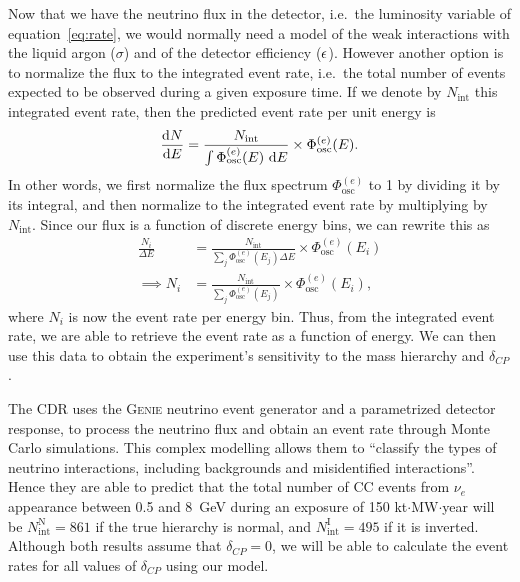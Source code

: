 Now that we have the neutrino flux in the detector, i.e.~the luminosity
variable of equation~\ref{eq:rate}, we would normally need a model of the weak
interactions with the liquid argon ($\sigma$) and of the detector efficiency
($\epsilon$).
However another option is to normalize the flux to the integrated event rate,
i.e.~the total number of events expected to be observed during a given exposure
time. If we denote by $N_\text{int}$ this integrated event rate, then the
predicted event rate per unit energy is
\begin{equation}
	\frac{\mathrm{d} N}{\mathrm{d} E} = \frac{N_\text{int}}{\int \Phi^{(e)}_\text{osc} (E)~\mathrm{d} E}
	\times \Phi^{(e)}_\text{osc} (E).
\end{equation}
In other words, we first normalize the flux spectrum $\Phi^{(e)}_\text{osc}$ to
1 by dividing it by its integral, and then normalize to the integrated event
rate by multiplying by $N_\text{int}$.
Since our flux is a function of discrete energy bins, we can rewrite this as
\begin{align}
	\frac{N_i}{\Delta E} &= \frac{N_\text{int}}{\sum\limits_j \Phi^{(e)}_\text{osc} (E_j)
	\Delta E} \times \Phi^{(e)}_\text{osc} (E_i)\nonumber\\\implies
	N_i &= \frac{N_\text{int}}{\sum\limits_j \Phi^{(e)}_\text{osc} (E_j)} \times
	\Phi^{(e)}_\text{osc} (E_i),\label{eq:event_rate_0}
\end{align}
where $N_i$ is now the event rate per energy bin.
Thus, from the integrated event rate, we are able to retrieve the event rate as
a function of energy. We can then use this data to obtain the experiment's
sensitivity to the mass hierarchy and $\delta_{CP}$.

The CDR uses the \textsc{Genie}\cite{GENIE} neutrino event generator and a
parametrized detector response, to process the neutrino flux and
obtain an event rate through Monte Carlo simulations. This complex modelling
allows them to ``classify the types of neutrino interactions, including
backgrounds and misidentified interactions''\cite{LBNE}. 
Hence they are able to predict that the total number
of CC events from $\nu_e$ appearance between 0.5 and \SI{8}{\GeV} during an exposure of 150
kt$\cdot$MW$\cdot$year will be $N^\text{N}_\text{int}=861$ if the true hierarchy is normal,
and $N^\text{I}_\text{int}=495$ if it is inverted. Although both results assume that
$\delta_{CP}=0$, we will be able to calculate the event rates for all values of
$\delta_{CP}$ using our model.

